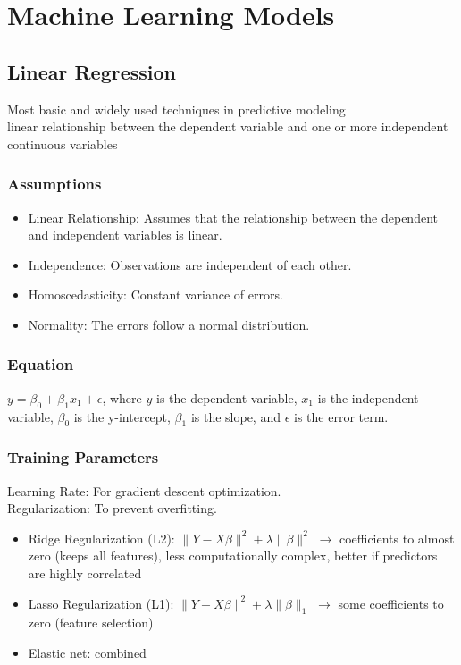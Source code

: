 \documentclass[english]{latex4ei/latex4ei_sheet}
\begin{document}
\section{Machine Learning Models}
\begin{sectionbox}
\subsection{Linear Regression}
Most basic and widely used techniques in predictive modeling\\
linear relationship between the dependent variable and one or more independent continuous variables
\subsubsection{Assumptions}
\begin{itemize}
    \item Linear Relationship: Assumes that the relationship between the dependent and independent variables is linear.
    \item Independence: Observations are independent of each other.
    \item Homoscedasticity: Constant variance of errors.
    \item Normality: The errors follow a normal distribution.
\end{itemize}

\subsubsection{Equation}
\(y = \beta_0 + \beta_1 x_1 + \epsilon\), where \(y\) is the dependent variable, \(x_1\) is the independent variable, \(\beta_0\) is the y-intercept, \(\beta_1\) is the slope, and \(\epsilon\) is the error term.

\subsubsection{Training Parameters}
Learning Rate: For gradient descent optimization.\\
Regularization: To prevent overfitting.
\begin{itemize}
    \item Ridge Regularization (L2): $\|Y-X \beta\|^{2}+\lambda\|\beta\|^{2}$ $\rightarrow$ coefficients to almost zero (keeps all features), less computationally complex, better if predictors are highly correlated
    \item Lasso Regularization (L1): $\|Y-X \beta\|^{2}+\lambda\|\beta\|_{1}$ $\rightarrow$ some coefficients to zero (feature selection)
    \item Elastic net: combined
\end{itemize}


\end{sectionbox}
\end{document}

